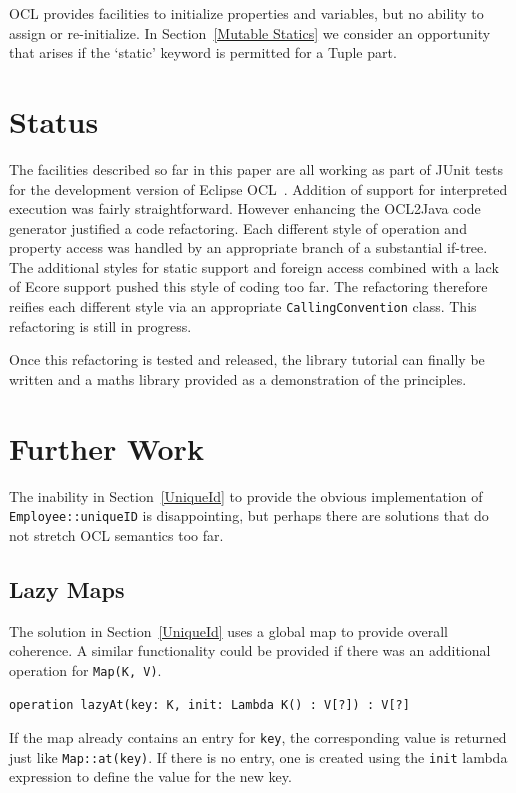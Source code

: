 \documentclass[sigconf]{acmart}
\begin{document}
OCL provides facilities to initialize properties and variables, but no ability to assign or re-initialize. In Section~\ref{Mutable Statics} we consider an opportunity that arises if the `static' keyword is permitted for a Tuple part. 
 
\section{Status}\label{Status}

The facilities described so far in this paper are all working as part of JUnit tests for the development version of Eclipse OCL~\cite{Eclipse-OCL}. Addition of support for interpreted execution was fairly straightforward. However enhancing the OCL2Java code generator justified a code refactoring. Each different style of operation and property access was handled by an appropriate branch of a substantial if-tree. The additional styles for static support and foreign access combined with a lack of Ecore support pushed this style of coding too far. The refactoring therefore reifies each different style via an appropriate \verb|CallingConvention| class. This refactoring is still in progress.

Once this refactoring is tested and released, the library tutorial can finally be written and a maths library provided as a demonstration of the principles.
 
\section{Further Work}\label{Further Work}

The inability in Section~\ref{UniqueId} to provide the obvious implementation of \verb|Employee::uniqueID| is disappointing, but perhaps there are solutions that do not stretch OCL semantics too far.

\subsection{Lazy Maps}

The solution in Section~\ref{UniqueId} uses a global map to provide overall coherence. A similar functionality could be provided if there was an additional operation for \verb|Map(K, V)|.

\begin{verbatim}
operation lazyAt(key: K, init: Lambda K() : V[?]) : V[?]
\end{verbatim} 

If the map already contains an entry for \verb|key|, the corresponding value is returned just like \verb|Map::at(key)|. If there is no entry, one is created using the \verb|init| lambda expression to define the value for the new key.
\end{document}
